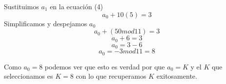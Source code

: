 \documentclass[a4paper,10pt]{article}
\begin{document}
Sustituimos $a_1$ en la ecuación (4) 
\begin{equation}
 a_0+10(5)=3
\end{equation}
Simplificamos y despejamos $a_0$
\begin{equation}
 a_0+(50mod11)=3
\end{equation}
\begin{equation}
 a_0+6=3
\end{equation}
\begin{equation}
 a_0=3-6
\end{equation}
\begin{equation}
 a_0=-3mod11=8
\end{equation}

Como $a_0=8$ podemos ver que esto es verdad por que $a_0=K$ y el $K$ que seleccionamos es $K=8$ con lo que recuperamos $K$ exitosamente.
\end{document}
